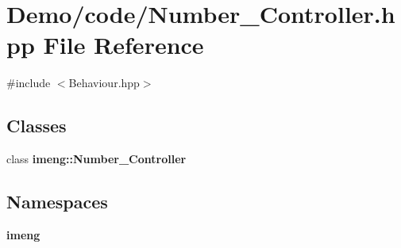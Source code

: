 \section{Demo/code/\+Number\+\_\+\+Controller.hpp File Reference}
\label{_number___controller_8hpp}
{\ttfamily \#include $<$Behaviour.\+hpp$>$}\newline
\subsection*{Classes}
\begin{DoxyCompactItemize}
\item 
class \textbf{ imeng\+::\+Number\+\_\+\+Controller}
\end{DoxyCompactItemize}
\subsection*{Namespaces}
\begin{DoxyCompactItemize}
\item 
 \textbf{ imeng}
\end{DoxyCompactItemize}
